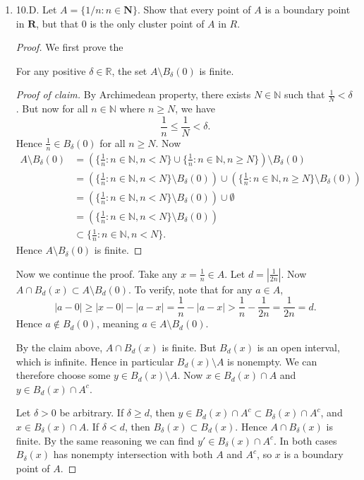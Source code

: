 \begin{enumerate}
	\item 10.D. Let $A=\{1 / n: n \in \mathbf{N}\}$. Show that every point of $A$ is a boundary point in $\boldsymbol{R}$, but that 0 is the only cluster point of $A$ in $R$.
\begin{proof}
	We first prove the 
	\begin{claim}
		For any positive $\delta \in \mathbb{R}$, the set $A \setminus B_\delta(0)$ is finite.
	\end{claim}
	\begin{proof}[Proof of claim]
		By Archimedean property, there exists $N \in \mathbb{N}$ such that $\frac{1}{N} < \delta$. But now for all $n \in \mathbb{N}$ where $n \ge N$, we have \[
			\frac{1}{n}\le \frac{1}{N}<\delta
		.\] 
		Hence $\frac{1}{n} \in B_\delta(0)$ for all $n \ge N$. Now
		\begin{align*}
			A \setminus  B_\delta(0)
			&=\left(\{\frac{1}{n}:n \in \mathbb{N}, n <N\} \cup \{\frac{1}{n}:n \in \mathbb{N}, n \ge N\}\right) \setminus  B_\delta(0)\\
			&=\left(\{\frac{1}{n}:n \in \mathbb{N}, n <N\} \setminus  B_\delta(0)\right) \cup \left(\{\frac{1}{n}:n \in \mathbb{N}, n \ge N\} \setminus  B_\delta(0)\right)\\
			&=\left(\{\frac{1}{n}:n \in \mathbb{N}, n <N\} \setminus  B_\delta(0)\right) \cup \emptyset \\
			&=\left(\{\frac{1}{n}:n \in \mathbb{N}, n <N\} \setminus  B_\delta(0)\right)\\
			&\subset \{\frac{1}{n}:n \in \mathbb{N}, n <N\}
			.
		\end{align*}
		Hence $A \setminus  B_\delta(0)$ is finite.
	\end{proof}
	
	Now we continue the proof. Take any $x = \frac{1}{n} \in A$. Let $d = \left| \frac{1}{2n} \right| $. Now $A \cap B_d(x) \subset A\setminus B_d(0)$. To verify, note that for any $a \in A$, \[
		|a - 0| \ge |x-0| - |a-x| = \frac{1}{n} - |a-x| > \frac{1}{n} - \frac{1}{2n} = \frac{1}{2n} = d
	.\] 
	Hence $a \not\in B_d(0)$, meaning $a \in A \setminus B_d(0)$.
	
	By the claim above, $A \cap B_d(x)$ is finite. But $B_d(x)$ is an open interval, which is infinite. Hence in particular $B_d(x) \setminus  A$ is nonempty. We can therefore choose some $y \in B_d(x) \setminus  A$. Now $x \in B_d(x) \cap A$ and $y \in B_d(x)\cap A^c$.

	Let $\delta>0$ be arbitrary. If $\delta \ge  d$, then $y \in B_d(x) \cap A^c \subset B_\delta(x) \cap A^c$, and $x \in B_\delta(x) \cap A$. 
	If $\delta< d$, then $B_\delta(x) \subset B_d(x)$. Hence $A \cap B_\delta(x)$ is finite. By the same reasoning we can find $y' \in B_\delta(x) \cap A^c$. In both cases $B_\delta(x)$ has nonempty intersection with both $A$ and $A^c$, so $x$ is a boundary point of $A$.


\end{proof}
\end{enumerate}
